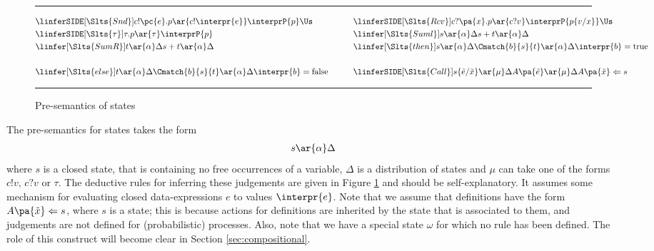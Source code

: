 \documentclass{LMCS}
\begin{document}
\begin{figure}[t]
\rule{\linewidth}{0.5mm}
  \begin{alignat*}{2}
    &\linferSIDE[\Slts{Snd}]
       {}
       {c!\pc{e}.p \ar{c!\interpr{e}} \interprP{p}\Us}
       {}
    &\qquad
    &
 \linferSIDE[\Slts{Rcv}]
       {}
       {c?\pa{x}.p \ar{c?v} \interprP{p\{v/x\}}\Us}
       {}
\\
  &\linferSIDE[\Slts{\tau}]
       {}
       {\tau.p \ar{\tau} \interprP{p}}
       {}
    &\qquad
    & \linfer[\Slts{Suml}]
       {s \ar{\alpha} \Delta}
       {s+t \ar{\alpha} \Delta}
\\
  &\linfer[\Slts{SumR}]
        {t \ar{\alpha} \Delta}
        {s+t \ar{\alpha} \Delta}
   &\qquad
   &\linfer[\Slts{then}]
         {s \ar{\alpha} \Delta}
         {\Cmatch{b}{s}{t} \ar{\alpha} \Delta}
         {\interpr{b} = \mbox{true}}
\\
\\  
 &\linfer[\Slts{else}]
          {t \ar{\alpha} \Delta}
          {\Cmatch{b}{s}{t} \ar{\alpha} \Delta}
          {\interpr{b} = \mbox{false}}
  &
  &\linferSIDE[\Slts{Call}]
         {s\{\tilde{e}/\tilde{x}\} \ar{\mu} \Delta}
         {A\pa{\tilde{e}} \ar{\mu} \Delta}
         {A\pa{\tilde{x}} \Leftarrow s}
  \end{alignat*}
  \caption{Pre-semantics of states}
  \label{fig:stsem}

\rule{\linewidth}{0.5mm}
\end{figure}

The pre-semantics for states takes the form
\begin{align*}
  s \ar{\alpha} \Delta
\end{align*}
where $s$ is a closed state, that is containing no free occurrences of a variable,  
$\Delta$  is a distribution of states and $\mu$ can take one of the forms $c!v,\,c?v$ or $\tau$. 
The deductive rules for inferring these judgements are given in Figure \ref{fig:stsem}
and should be self-explanatory. It assumes some mechanism for evaluating closed data-expressions
$e$ to values $\interpr{e}$. Note that we assume that definitions have the form $A\pa{\tilde{x}} \Leftarrow s$, 
where $s$ is a state; this is because actions for definitions are inherited by the state that is 
associated to them, and judgements are not defined for (probabilistic) processes. Also, note that 
we have a special state $\omega$ for which no rule has been defined. The role of 
this construct will become clear in Section \ref{sec:compositional}.
\end{document}
